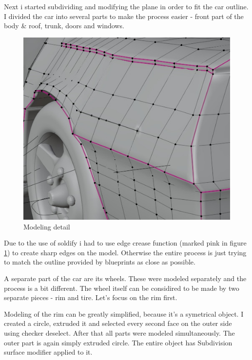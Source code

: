 \documentclass[12pt,a4paper,titlepage,final]{report}
\begin{document}
Next i started subdividing and modifying the plane in order to fit the car outline. I divided the car into several parts to make the process easier - front part of the body \& roof, trunk, doors and windows. 

\begin{figure}[H]
    \centering
    \includegraphics{images/edge_crease.jpg}
    \caption{Modeling detail}
    \label{fig:edge_crease}
\end{figure}

Due to the use of soldify i had to use edge crease function (marked pink in figure \ref{fig:edge_crease}) to create sharp edges on the model. Otherwise the entire process is just trying to match the outline provided by blueprints as close as possible.

A separate part of the car are its wheels. These were modeled separately and the process is a bit different. The wheel itself can be considired to be made by two separate pieces - rim and tire. Let's focus on the rim first.

Modeling of the rim can be greatly simplified, because it's a symetrical object. I created a circle, extruded it and selected every second face on the outer side using checker deselect. After that all parts were modeled simultaneously. The outer part is again simply extruded circle. The entire object has Subdivision surface modifier applied to it.
\end{document}
